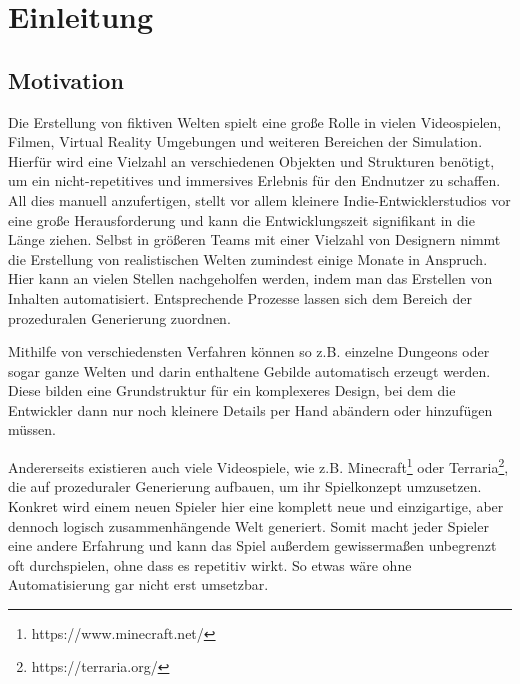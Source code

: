 %
\chapter{Einleitung}

\section{Motivation}
Die Erstellung von fiktiven Welten spielt eine große Rolle in vielen Videospielen, Filmen, Virtual Reality Umgebungen
und weiteren Bereichen der Simulation. Hierfür wird eine Vielzahl an verschiedenen Objekten und Strukturen benötigt, um
ein nicht-repetitives und immersives Erlebnis für den Endnutzer zu schaffen. All dies manuell anzufertigen, stellt vor
allem kleinere Indie-Entwicklerstudios vor eine große Herausforderung und kann die Entwicklungszeit signifikant in die
Länge ziehen. Selbst in größeren Teams mit einer Vielzahl von Designern nimmt die Erstellung von realistischen Welten zumindest
einige Monate in Anspruch. \cite{10_freiknecht} Hier kann an vielen Stellen nachgeholfen werden, indem man das Erstellen
von Inhalten automatisiert. Entsprechende Prozesse lassen sich dem Bereich der prozeduralen Generierung zuordnen.


Mithilfe von verschiedensten Verfahren können so z.B. einzelne Dungeons oder sogar ganze Welten und darin enthaltene Gebilde
automatisch erzeugt werden. Diese bilden eine Grundstruktur für ein komplexeres Design, bei dem die Entwickler dann nur noch
kleinere Details per Hand abändern oder hinzufügen müssen. \cite{10_freiknecht}

Andererseits existieren auch viele Videospiele, wie z.B. Minecraft\footnote{https://www.minecraft.net/} oder
Terraria\footnote{https://terraria.org/}, die auf prozeduraler Generierung aufbauen, um ihr Spielkonzept umzusetzen.
Konkret wird einem neuen Spieler hier eine komplett neue und einzigartige, aber dennoch logisch
zusammenhängende Welt generiert. Somit macht jeder Spieler eine andere Erfahrung und kann das Spiel außerdem gewissermaßen
unbegrenzt oft durchspielen, ohne dass es repetitiv wirkt. So etwas wäre ohne Automatisierung gar nicht erst umsetzbar.

